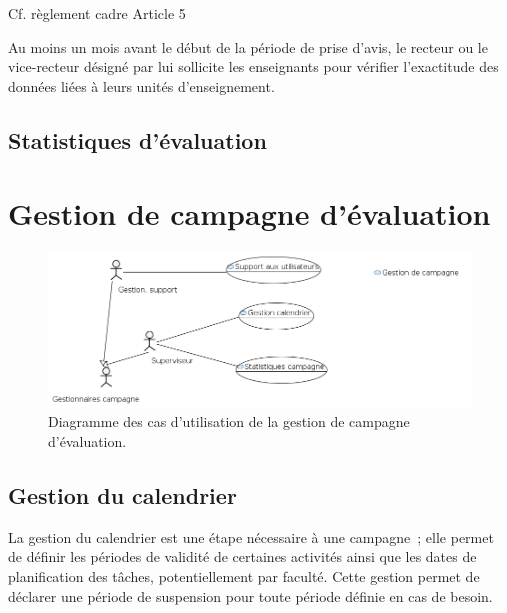 \documentclass[a4paper,11pt]{report}
\begin{document}
Cf. règlement cadre Article 5

Au moins un mois avant le début de la période de prise d'avis, le recteur ou le vice-recteur désigné par lui sollicite les enseignants pour vérifier l'exactitude des données liées à leurs unités d'enseignement.






\subsection{Statistiques d'évaluation}


















\newpage
\section{Gestion de campagne d'évaluation}

\begin{figure}[ht]
\includegraphics[width=\linewidth]{workspace/evalens-usecases/gestion_campagne.png}
\caption{Diagramme des cas d'utilisation de la gestion de campagne d'évaluation.}
\label{fig:usecase-campagne}
\end{figure}


\subsection{Gestion du calendrier}
La gestion du calendrier est une étape nécessaire à une campagne~; elle permet de définir les périodes de validité de certaines activités ainsi que les dates de planification des tâches, potentiellement par faculté.
Cette gestion permet de déclarer une période de suspension pour toute période définie en cas de besoin.
\end{document}
